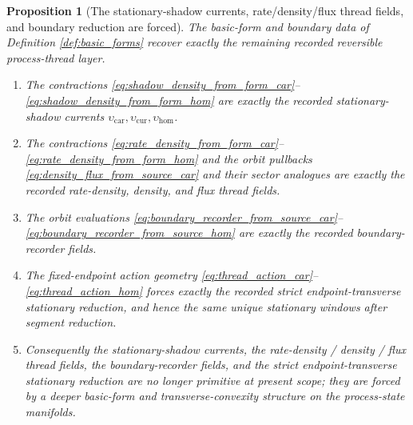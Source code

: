 \documentclass[11pt]{article}
\newcommand{\TensorShadowDensity}{\upsilon_{\mathrm{car}}}
\newcommand{\CurShadowDensity}{\upsilon_{\mathrm{cur}}}
\newcommand{\HomShadowDensity}{\upsilon_{\mathrm{hom}}}
\newtheorem{proposition}{Proposition}
\begin{document}
\begin{proposition}[The stationary-shadow currents, rate/density/flux thread fields, and boundary reduction are forced]
\label{prop:thread_fields_forced}
The basic-form and boundary data of Definition \ref{def:basic_forms} recover exactly the remaining recorded reversible process-thread layer.
\begin{enumerate}
    \item The contractions \eqref{eq:shadow_density_from_form_car}--\eqref{eq:shadow_density_from_form_hom} are exactly the recorded stationary-shadow currents \(\TensorShadowDensity,\CurShadowDensity,\HomShadowDensity\).
    \item The contractions \eqref{eq:rate_density_from_form_car}--\eqref{eq:rate_density_from_form_hom} and the orbit pullbacks \eqref{eq:density_flux_from_source_car} and their sector analogues are exactly the recorded rate-density, density, and flux thread fields.
    \item The orbit evaluations \eqref{eq:boundary_recorder_from_source_car}--\eqref{eq:boundary_recorder_from_source_hom} are exactly the recorded boundary-recorder fields.
    \item The fixed-endpoint action geometry \eqref{eq:thread_action_car}--\eqref{eq:thread_action_hom} forces exactly the recorded strict endpoint-transverse stationary reduction, and hence the same unique stationary windows after segment reduction.
    \item Consequently the stationary-shadow currents, the rate-density / density / flux thread fields, the boundary-recorder fields, and the strict endpoint-transverse stationary reduction are no longer primitive at present scope; they are forced by a deeper basic-form and transverse-convexity structure on the process-state manifolds.
\end{enumerate}
\end{proposition}
\end{document}
